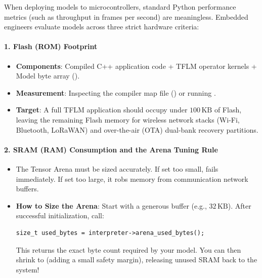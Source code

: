 \begin{iotbox}
When deploying models to microcontrollers, standard Python performance metrics (such as throughput in frames per second) are meaningless. Embedded engineers evaluate models across three strict hardware criteria:

\paragraph{1. Flash (ROM) Footprint}
\begin{itemize}
    \item \textbf{Components}: Compiled C++ application code + TFLM operator kernels + Model byte array ().
    \item \textbf{Measurement}: Inspecting the compiler map file () or running .
    \item \textbf{Target}: A full TFLM application should occupy under $100\,\text{KB}$ of Flash, leaving the remaining Flash memory for wireless network stacks (Wi-Fi, Bluetooth, LoRaWAN) and over-the-air (OTA) dual-bank recovery partitions.
\end{itemize}

\paragraph{2. SRAM (RAM) Consumption and the Arena Tuning Rule}
\begin{itemize}
    \item The Tensor Arena must be sized accurately. If set too small,  fails immediately. If set too large, it robs memory from communication network buffers.
    \item \textbf{How to Size the Arena}: Start with a generous buffer (e.g., $32\,\text{KB}$). After successful initialization, call:
    \begin{lstlisting}[style=pythonstyle, numbers=none]
    size_t used_bytes = interpreter->arena_used_bytes();
    \end{lstlisting}
    This returns the exact byte count required by your model. You can then shrink  to  (adding a small safety margin), releasing unused SRAM back to the system!
\end{itemize}


\end{iotbox}
